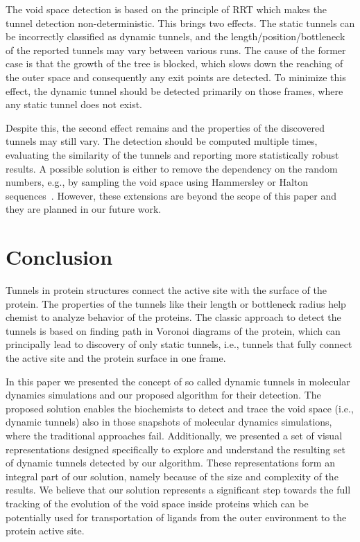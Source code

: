 \documentclass[usletter, 10pt, conference]{svjour3}      %
\begin{document}
The void space detection is based on the principle of RRT which makes the tunnel detection non-deterministic.
This brings two effects. The static tunnels can be incorrectly classified as dynamic tunnels, and the length/position/bottleneck of the reported tunnels may vary between various runs.
The cause of the former case is that the growth of the tree is blocked, which slows down the reaching of the outer space and consequently any exit points are detected.
To minimize this effect, the dynamic tunnel should be detected primarily on those frames, where any static tunnel does not exist.

Despite this, the second effect remains and the properties of the discovered tunnels may still vary.
The detection should be computed multiple times, evaluating the similarity of the tunnels and reporting more statistically robust results.
A possible solution is either to remove the dependency on the random numbers, e.g., by sampling the void space using Hammersley or Halton sequences~\cite{Lav06,branickyQuasi,rosell2007general}.
However, these extensions are beyond the scope of this paper and they are planned in our future work.










\section{Conclusion }

Tunnels in protein structures connect the active site with the surface of the protein.
The properties of the tunnels like their length or bottleneck radius help chemist to analyze behavior of the proteins.
The classic approach to detect the tunnels is based on finding path in Voronoi diagrams of the protein, which can principally
lead to discovery of only static tunnels, i.e., tunnels that fully connect the active site and the protein surface in one frame.

In this paper we presented the concept of so called dynamic tunnels in molecular dynamics simulations and our proposed algorithm for their detection.
The proposed solution enables the biochemists to detect and trace the void space (i.e., dynamic tunnels) also in those snapshots of molecular dynamics simulations, where the traditional approaches fail.
Additionally, we presented a set of visual representations designed specifically to explore and understand the resulting set of dynamic tunnels detected by our algorithm. 
These representations form an integral part of our solution, namely because of the size and complexity of the results. 
We believe that our solution represents a significant step towards the full tracking of the evolution of the void space inside proteins which can be potentially used for transportation of ligands from the outer environment to the protein active site.
\end{document}
